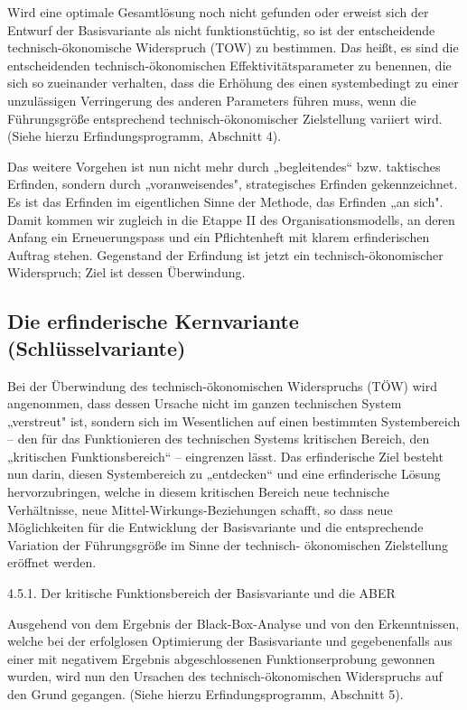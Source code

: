 \documentclass[12pt,a4paper]{article}
\begin{document}
Wird eine optimale Gesamtlösung noch nicht gefunden oder erweist sich der
Entwurf der Basisvariante als nicht funktionstüchtig, so ist der entscheidende
technisch-ökonomische Widerspruch (TOW) zu bestimmen. Das heißt, es sind die
entscheidenden technisch-ökonomischen Effektivitätsparameter zu benennen, die
sich so zueinander verhalten, dass die Erhöhung des einen systembedingt zu
einer unzulässigen Verringerung des anderen Parameters führen muss, wenn die
Führungsgröße entsprechend technisch-ökonomischer Zielstellung variiert
wird. (Siehe hierzu Erfindungsprogramm, Abschnitt 4).

Das weitere Vorgehen ist nun nicht mehr durch „begleitendes“ bzw. taktisches
Erfinden, sondern durch „voranweisendes", strategisches Erfinden
gekennzeichnet. Es ist das Erfinden im eigentlichen Sinne der Methode, das
Erfinden „an sich". Damit kommen wir zugleich in die Etappe II des
Organisationsmodells, an deren Anfang ein Erneuerungspass und ein
Pflichtenheft mit klarem erfinderischen Auftrag stehen. Gegenstand der
Erfindung ist jetzt ein technisch-ökonomischer Widerspruch; Ziel ist dessen
Überwindung.


\subsection{Die erfinderische Kernvariante (Schlüsselvariante)}

Bei der Überwindung des technisch-ökonomischen Widerspruchs (TÖW) wird
angenommen, dass dessen Ursache nicht im ganzen technischen System „verstreut"
ist, sondern sich im Wesentlichen auf einen bestimmten Systembereich -- den für
das Funktionieren des technischen Systems kritischen Bereich, den „kritischen
Funktionsbereich“ -- eingrenzen lässt. Das erfinderische Ziel besteht nun
darin, diesen Systembereich zu „entdecken“ und eine erfinderische Lösung
hervorzubringen, welche in diesem kritischen Bereich neue technische
Verhältnisse, neue Mittel-Wirkungs-Beziehungen schafft, so dass neue
Möglichkeiten für die Entwicklung der Basisvariante und die entsprechende
Variation der Führungsgröße im Sinne der technisch- ökonomischen Zielstellung
eröffnet werden.

4.5.1.  Der kritische Funktionsbereich der Basisvariante und die ABER

Ausgehend von dem Ergebnis der Black-Box-Analyse und von den Erkenntnissen,
welche bei der erfolglosen Optimierung der Basisvariante und gegebenenfalls
aus einer mit negativem Ergebnis abgeschlossenen Funktionserprobung gewonnen
wurden, wird nun den Ursachen des technisch-ökonomischen Widerspruchs auf den
Grund gegangen. (Siehe hierzu Erfindungsprogramm, Abschnitt 5).
\end{document}
